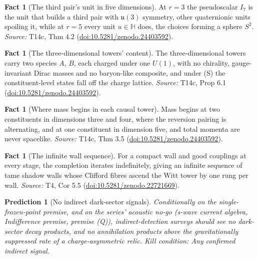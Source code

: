 \documentclass[11pt]{article}
\newtheorem{prediction}[theorem]{Prediction}
\theoremstyle{definition}
\newtheorem{fact}[theorem]{Fact}
\theoremstyle{plain}
\providecommand{\HH}{}\renewcommand{\HH}{\mathbb{H}}
\providecommand{\uu}{}\renewcommand{\uu}{\mathfrak{u}}
\begin{document}
\begin{fact}[The third pair's unit in five dimensions]\label{c:dark-tower-matter.third-pairs-unit-five-dimensions}
At $r = 3$ the pseudoscalar $I_7$ is the unit that builds a third pair with $\uu(3)$ symmetry, other quaternionic units spoiling it, while at $r = 5$ every unit $u \in \HH$ does, the choices forming a sphere $S^2$.
\emph{Source:} T14c, Thm 4.2 (\href{https://doi.org/10.5281/zenodo.24403592}{doi:10.5281/zenodo.24403592}).
\end{fact}

\begin{fact}[The three-dimensional towers' content]\label{c:dark-tower-matter.three-dimensional-content}
The three-dimensional towers carry two species $A$, $B$, each charged under one $U(1)$, with no chirality, gauge-invariant Dirac masses and no baryon-like composite, and under (S) the constituent-level states fall off the charge lattice.
\emph{Source:} T14c, Prop 6.1 (\href{https://doi.org/10.5281/zenodo.24403592}{doi:10.5281/zenodo.24403592}).
\end{fact}

\begin{fact}[Where mass begins in each causal tower]\label{c:dark-tower-matter.where-mass-begins}
Mass begins at two constituents in dimensions three and four, where the reversion pairing is alternating, and at one constituent in dimension five, and total momenta are never spacelike.
\emph{Source:} T14c, Thm 3.5 (\href{https://doi.org/10.5281/zenodo.24403592}{doi:10.5281/zenodo.24403592}).
\end{fact}

\begin{fact}[The infinite wall sequence]\label{c:sheaf.infinite-wall-sequence}
For a compact wall and good couplings at every stage, the completion iterates indefinitely, giving an infinite sequence of tame shadow walls whose Clifford fibres ascend the Witt tower by one rung per wall.
\emph{Source:} T4, Cor 5.5 (\href{https://doi.org/10.5281/zenodo.22721669}{doi:10.5281/zenodo.22721669}).
\end{fact}

\begin{prediction}[No indirect dark-sector signals]\label{c:pred.no-indirect-dark-signals}
Conditionally on the single-frozen-point premise, and on the series' acoustic no-go (s-wave current algebra, Indifference premise, premise (Q)), indirect-detection surveys should see no dark-sector decay products, and no annihilation products above the gravitationally suppressed rate of a charge-asymmetric relic.
\emph{Kill condition:} Any confirmed indirect signal.
\end{prediction}
\end{document}
